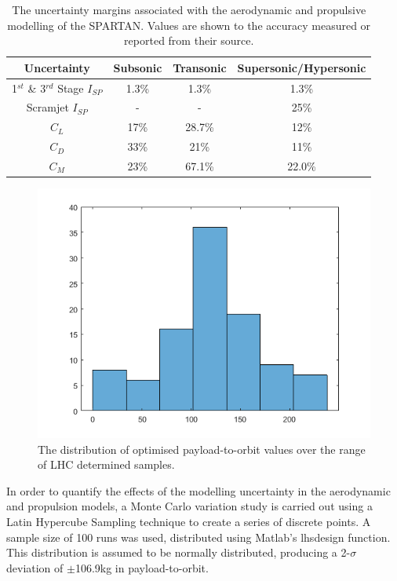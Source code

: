 
\begin{table}[ht]
	\centering
	\begin{tabular}{|c|c|c|c|}
		\hline  Uncertainty & Subsonic & Transonic  & Supersonic/Hypersonic \\ 
		\hline  1$^{st}$ \& 3$^{rd}$ Stage $I_{SP}$ & 1.3\% & 1.3\% &  1.3\% \\ 
		\hline  Scramjet $I_{SP}$ & - & - &  25\% \\ 
		\hline   $C_L$ & 17\% & 28.7\% & 12\% \\  
		\hline   $C_D$ & 33\% & 21\% & 11\% \\  
		\hline   $C_M$  & 23\% & 67.1\% &  22.0\% \\ 
		\hline 
	\end{tabular}
	\caption{The uncertainty margins associated with the aerodynamic and propulsive modelling of the SPARTAN. Values are shown to the accuracy measured or reported from their source.}
	\label{tab:AppendixUncertainty}
\end{table}



\begin{figure}[ht]
	\centering
	\includegraphics[width=0.7\linewidth]{figures/A1_uncertainty-analysis/LHC}
	\caption{The distribution of optimised payload-to-orbit values over the range of LHC determined samples.}
	\label{fig:LHC-17bins}
\end{figure}

In order to quantify the effects of the modelling uncertainty in the aerodynamic and propulsion models, a Monte Carlo variation study is carried out using a Latin Hypercube Sampling technique to create a series of discrete points. A sample size of 100 runs was used, distributed using Matlab's \textsf{lhsdesign} function. This distribution is assumed to be normally distributed, producing a 2-$\sigma$ deviation of $\pm$106.9kg in payload-to-orbit. 




